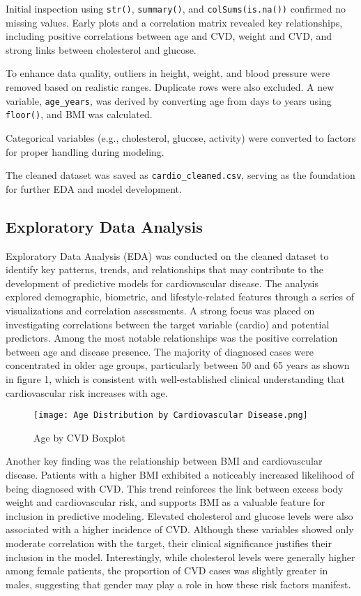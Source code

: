 \documentclass[conference]{IEEEtran}
\begin{document}
Initial inspection using \texttt{str()}, \texttt{summary()}, and \texttt{colSums(is.na())} confirmed no missing values. Early plots and a correlation matrix revealed key relationships, including positive correlations between age and CVD, weight and CVD, and strong links between cholesterol and glucose.


To enhance data quality, outliers in height, weight, and blood pressure were removed based on realistic ranges. Duplicate rows were also excluded. A new variable, \texttt{age\_years}, was derived by converting age from days to years using \texttt{floor()}, and BMI was calculated.

Categorical variables (e.g., cholesterol, glucose, activity) were converted to factors for proper handling during modeling.

The cleaned dataset was saved as \texttt{cardio\_cleaned.csv}, serving as the foundation for further EDA and model development.


\subsection{Exploratory Data Analysis}

Exploratory Data Analysis (EDA) was conducted on the cleaned dataset to identify key patterns, trends, and relationships that may contribute to the development of predictive models for cardiovascular disease. The analysis explored demographic, biometric, and lifestyle-related features through a series of visualizations and correlation assessments.
A strong focus was placed on investigating correlations between the target variable (cardio) and potential predictors. Among the most notable relationships was the positive correlation between age and disease presence. The majority of diagnosed cases were concentrated in older age groups, particularly between 50 and 65 years as shown in figure 1, which is consistent with well-established clinical understanding that cardiovascular risk increases with age. 

\begin{figure}[htbp]
\centerline{\texttt{[image: Age Distribution by Cardiovascular Disease.png]}}
\caption{Age by CVD Boxplot}
\label{fig}
\end{figure}

Another key finding was the relationship between BMI and cardiovascular disease. Patients with a higher BMI exhibited a noticeably increased likelihood of being diagnosed with CVD. This trend reinforces the link between excess body weight and cardiovascular risk, and supports BMI as a valuable feature for inclusion in predictive modeling.
Elevated cholesterol and glucose levels were also associated with a higher incidence of CVD. Although these variables showed only moderate correlation with the target, their clinical significance justifies their inclusion in the model. Interestingly, while cholesterol levels were generally higher among female patients, the proportion of CVD cases was slightly greater in males, suggesting that gender may play a role in how these risk factors manifest.
\end{document}
